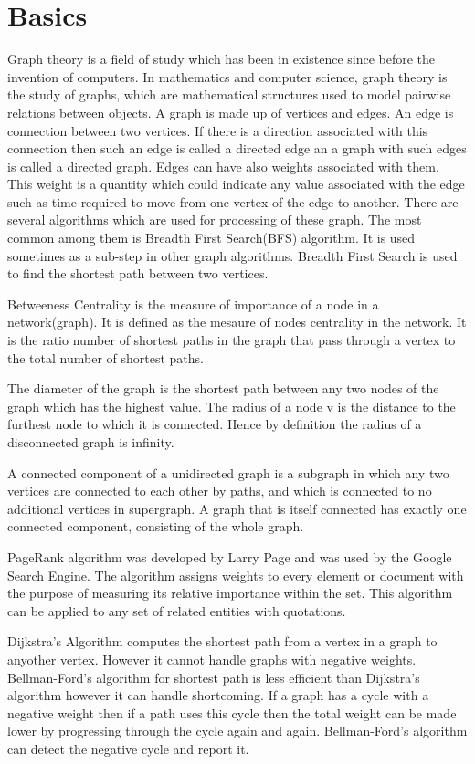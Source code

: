 \documentclass[a4paper,10pt,twoside]{article}
\begin{document}
\section{Basics}

Graph theory is a field of study which has been in existence since before the invention of computers. In mathematics and computer science, graph theory is the study of graphs, which are mathematical structures used to model pairwise relations between objects\cite{wiki:GraphTheory}. A graph is made up of vertices and edges. An edge is connection between two vertices. If there is a direction associated with this connection then such an edge is called a directed edge an a graph with such edges is called a directed graph. Edges can have also weights associated with them. This weight is a quantity which could indicate any value associated with the edge such as time required to move from one vertex of the edge to another. 
	There are several algorithms which are used for processing of these graph. The most common among them is Breadth First Search(BFS) algorithm. It is used sometimes as a sub-step in other graph algorithms. Breadth First Search is used to find the shortest path between two vertices. 

	Betweeness Centrality is the measure of importance of a node in a network(graph). It is defined as the mesaure of nodes centrality in the network. It is the  ratio number of shortest paths in the graph that pass through a vertex to the total number of shortest paths.

	The diameter of the graph is the shortest path between any two nodes of the graph which has the highest value. The radius of a node v is the distance to the furthest node to which it is connected. Hence by definition the radius of a disconnected graph is infinity.

	A connected component of a unidirected graph is a subgraph in which any two vertices are connected to each other by paths, and which is connected to no additional vertices in supergraph. A graph that is itself connected has exactly one connected component, consisting of the whole graph.

	PageRank algorithm \cite{Brin:1998:ALH:297810.297827} was developed by Larry Page and was used by the Google Search Engine. The algorithm assigns weights to every element or document with the purpose of measuring its relative importance within the set. This algorithm can be applied to any set of related entities with quotations.

	Dijkstra's Algorithm computes the shortest path from a vertex in a graph to anyother vertex. However it cannot handle graphs with negative weights. Bellman-Ford's algorithm for shortest path is less efficient than Dijkstra's algorithm however it can handle shortcoming. If a graph has a cycle with a negative weight then if a path uses this cycle then the total weight can be made lower by progressing through the cycle again and again. Bellman-Ford's algorithm can detect the negative cycle and report it.
\end{document}
